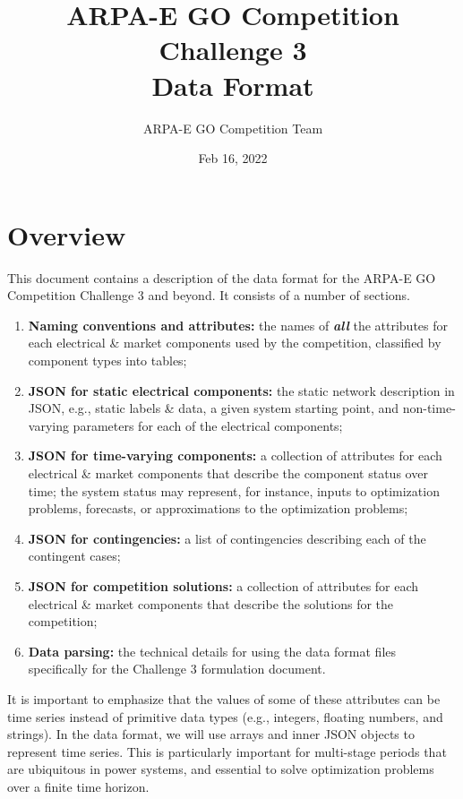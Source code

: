 \documentclass{article}
\title{ARPA-E GO Competition Challenge 3 \\ Data Format}
\author{ARPA-E GO Competition Team}
\date{Feb 16, 2022}
\begin{document}
\maketitle

\section{Overview}

This document contains a description of the data format for the ARPA-E GO Competition Challenge 3 and beyond. It consists of a number of sections.
\begin{enumerate}[I]
    \item {\bf Naming conventions and attributes:} the names of \textit{\textbf{all}} the attributes for each electrical \& market components used by the competition, classified by component types into tables;

    \item {\bf JSON for static electrical components:} the static network description in JSON, e.g., static labels \& data, a given system starting point, and non-time-varying parameters for each of the electrical components;

    \item {\bf JSON for time-varying components:} a collection of attributes for each electrical \& market components that describe the component status over time; the system status may represent, for instance, inputs to optimization problems,  forecasts, or approximations to the optimization problems;
    \item {\bf JSON for contingencies:} a list of contingencies describing each of the contingent cases;
    \item {\bf JSON for competition solutions:} a collection of attributes for each electrical \& market components that describe the solutions for the competition;    
     \item {\bf Data parsing:}
     the technical details for using the data format files specifically for the Challenge 3 formulation document.
\end{enumerate}
It is important to emphasize that the values of some of these attributes can be time series instead of primitive data types (e.g., integers, floating numbers, and strings). 
In the data format, we will use arrays and inner JSON objects to represent time series. 
This is particularly important for multi-stage periods that are ubiquitous in power systems, and essential 
to solve optimization problems over a finite time horizon. 
\end{document}
